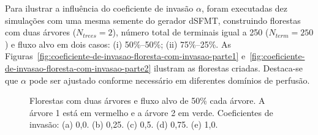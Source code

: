 Para ilustrar a influência do coeficiente de invasão $\alpha$, foram executadas dez simulações 
com uma mesma semente do gerador dSFMT, construindo florestas com duas árvores ($N_{trees} = 2$),
número total de terminais igual a 250 ($N_{term} = 250$) e fluxo alvo em dois casos:
(i) 50\%--50\%; (ii) 75\%--25\%.
As Figuras~\ref{fig:coeficiente-de-invasao-floresta-com-invasao-parte1} e~\ref{fig:coeficiente-de-invasao-floresta-com-invasao-parte2} 
ilustram as florestas criadas. Destaca-se que $\alpha$ pode ser ajustado conforme 
necessário em diferentes domínios de perfusão.

\clearpage

\begin{figure}[!htb]
  \centering
  \captiondelim{: }
  \caption{Florestas com duas árvores e fluxo alvo de 50\% cada árvore. A árvore 1 está em vermelho e a árvore 2 em verde. Coeficientes de invasão:
  (a) 0,0. (b) 0,25. (c) 0,5. (d) 0,75. (e) 1,0.}
  

\end{figure}
